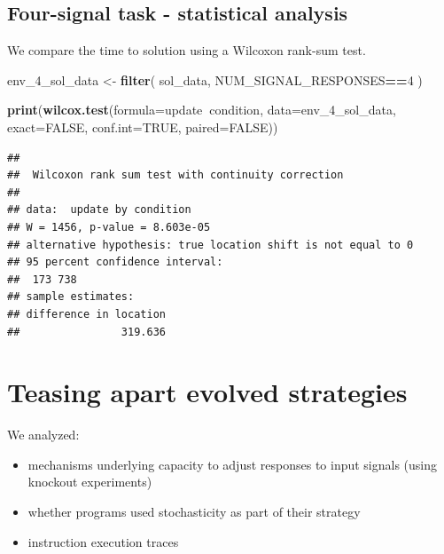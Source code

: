 \documentclass[]{book}
\newenvironment{Shaded}{\begin{snugshade}}{\end{snugshade}}
\newcommand{\DataTypeTok}[1]{\textcolor[rgb]{0.13,0.29,0.53}{#1}}
\newcommand{\DecValTok}[1]{\textcolor[rgb]{0.00,0.00,0.81}{#1}}
\newcommand{\KeywordTok}[1]{\textcolor[rgb]{0.13,0.29,0.53}{\textbf{#1}}}
\newcommand{\NormalTok}[1]{#1}
\newcommand{\OperatorTok}[1]{\textcolor[rgb]{0.81,0.36,0.00}{\textbf{#1}}}
\newcommand{\OtherTok}[1]{\textcolor[rgb]{0.56,0.35,0.01}{#1}}
\newcommand{\StringTok}[1]{\textcolor[rgb]{0.31,0.60,0.02}{#1}}
\providecommand{\tightlist}{%
  \setlength{\itemsep}{0pt}\setlength{\parskip}{0pt}}
\begin{document}
\hypertarget{four-signal-task---statistical-analysis}{%
\subsection{Four-signal task - statistical analysis}\label{four-signal-task---statistical-analysis}}

We compare the time to solution using a Wilcoxon rank-sum test.

\begin{Shaded}
\begin{Highlighting}[]
\NormalTok{env_}\DecValTok{4}\NormalTok{_sol_data <-}\StringTok{ }\KeywordTok{filter}\NormalTok{(}
\NormalTok{  sol_data,}
\NormalTok{  NUM_SIGNAL_RESPONSES}\OperatorTok{==}\DecValTok{4}
\NormalTok{)}

\KeywordTok{print}\NormalTok{(}\KeywordTok{wilcox.test}\NormalTok{(}\DataTypeTok{formula=}\NormalTok{update}\OperatorTok{~}\NormalTok{condition, }\DataTypeTok{data=}\NormalTok{env_}\DecValTok{4}\NormalTok{_sol_data, }\DataTypeTok{exact=}\OtherTok{FALSE}\NormalTok{, }\DataTypeTok{conf.int=}\OtherTok{TRUE}\NormalTok{, }\DataTypeTok{paired=}\OtherTok{FALSE}\NormalTok{))}
\end{Highlighting}
\end{Shaded}

\begin{verbatim}
## 
##  Wilcoxon rank sum test with continuity correction
## 
## data:  update by condition
## W = 1456, p-value = 8.603e-05
## alternative hypothesis: true location shift is not equal to 0
## 95 percent confidence interval:
##  173 738
## sample estimates:
## difference in location 
##                319.636
\end{verbatim}

\hypertarget{teasing-apart-evolved-strategies}{%
\section{Teasing apart evolved strategies}\label{teasing-apart-evolved-strategies}}

We analyzed:

\begin{itemize}
\tightlist
\item
  mechanisms underlying capacity to adjust responses to input signals (using knockout experiments)
\item
  whether programs used stochasticity as part of their strategy
\item
  instruction execution traces
\end{itemize}
\end{document}
